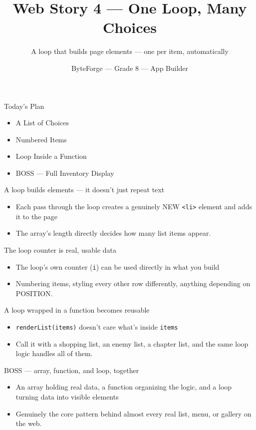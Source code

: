 \documentclass[aspectratio=169]{beamer}
\title{Web Story 4 — One Loop, Many Choices}
\subtitle{A loop that builds page elements — one per item, automatically}
\author{ByteForge --- Grade 8 --- App Builder}
\date{}
\begin{document}
\begin{frame}
    \titlepage
\end{frame}

\begin{frame}{Today's Plan}
    \begin{itemize}
        \item A List of Choices
        \item Numbered Items
        \item Loop Inside a Function
        \item[$\bigstar$] BOSS --- Full Inventory Display
    \end{itemize}
\end{frame}

\begin{frame}{A loop builds elements — it doesn't just repeat text}
    \large
    \begin{itemize}
        \item Each pass through the loop creates a genuinely NEW \texttt{<li>} element and adds it to the page
        \item The array's length directly decides how many list items appear.
    \end{itemize}
\end{frame}


\begin{frame}{The loop counter is real, usable data}
    \large
    \begin{itemize}
        \item The loop's own counter (\texttt{i}) can be used directly in what you build
        \item Numbering items, styling every other row differently, anything depending on POSITION.
    \end{itemize}
\end{frame}


\begin{frame}{A loop wrapped in a function becomes reusable}
    \large
    \begin{itemize}
        \item \texttt{renderList(items)} doesn't care what's inside \texttt{items}
        \item Call it with a shopping list, an enemy list, a chapter list, and the same loop logic handles all of them.
    \end{itemize}
\end{frame}


\begin{frame}{BOSS — array, function, and loop, together}
    \large
    \begin{itemize}
        \item An array holding real data, a function organizing the logic, and a loop turning data into visible elements
        \item Genuinely the core pattern behind almost every real list, menu, or gallery on the web.
    \end{itemize}
\end{frame}
\end{document}
